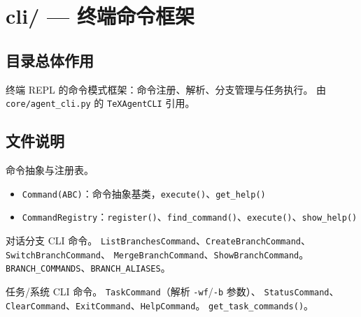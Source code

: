 \section{cli/ — 终端命令框架}

\subsection{目录总体作用}

终端 REPL 的命令模式框架：命令注册、解析、分支管理与任务执行。
由 \texttt{core/agent\_cli.py} 的 \texttt{TeXAgentCLI} 引用。

\subsection{文件说明}

\begin{description}[leftmargin=4em,style=nextline]
    \item[\texttt{commands.py}]
    命令抽象与注册表。
    \begin{itemize}
        \item \texttt{Command(ABC)}：命令抽象基类，\texttt{execute()}、\texttt{get\_help()}
        \item \texttt{CommandRegistry}：\texttt{register()}、\texttt{find\_command()}、\texttt{execute()}、\texttt{show\_help()}
    \end{itemize}

    \item[\texttt{branch\_commands.py}]
    对话分支 CLI 命令。
    \texttt{ListBranchesCommand}、\texttt{CreateBranchCommand}、\texttt{SwitchBranchCommand}、
    \texttt{MergeBranchCommand}、\texttt{ShowBranchCommand}。
    \texttt{BRANCH\_COMMANDS}、\texttt{BRANCH\_ALIASES}。

    \item[\texttt{task\_commands.py}]
    任务/系统 CLI 命令。
    \texttt{TaskCommand}（解析 \texttt{-wf}/\texttt{-b} 参数）、
    \texttt{StatusCommand}、\texttt{ClearCommand}、\texttt{ExitCommand}、\texttt{HelpCommand}。
    \texttt{get\_task\_commands()}。
\end{description}
